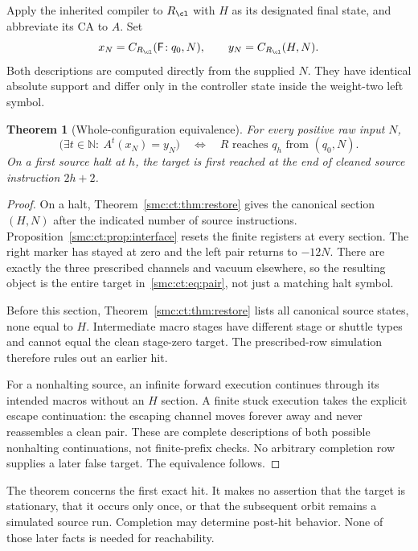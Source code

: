 \documentclass[11pt,letterpaper]{article}
\numberwithin{equation}{section}
\newtheorem{theorem}{Theorem}[section]
\theoremstyle{definition}
\theoremstyle{remark}
\newcommand{\NN}{\mathbb N}
\newcommand{\Fq}[1]{\mathsf F\!:#1}\newcommand{\Bq}[1]{\mathsf B\!:#1}
\begin{document}
Apply the inherited compiler to $R_{\cl}$ with $H$ as its designated final state, and abbreviate its CA to $A$. Set
\begin{equation}\label{smc:ct:eq:pair}
x_N=C_{R_{\cl}}(\Fq {q_0},N),\qquad y_N=C_{R_{\cl}}(H,N).
\end{equation}
Both descriptions are computed directly from the supplied $N$. They have identical absolute support and differ only in the controller state inside the weight-two left symbol.

\begin{theorem}[Whole-configuration equivalence]\label{smc:ct:thm:equiv}
For every positive raw input $N$,
\[
\bigl(\exists t\in\NN:\ A^t(x_N)=y_N\bigr)
\quad\Longleftrightarrow\quad
R\text{ reaches }q_h\text{ from }(q_0,N).
\]
On a first source halt at $h$, the target is first reached at the end of cleaned source instruction $2h+2$.
\end{theorem}
\begin{proof}
On a halt, Theorem~\ref{smc:ct:thm:restore} gives the canonical section $(H,N)$ after the indicated number of source instructions. Proposition~\ref{smc:ct:prop:interface} resets the finite registers at every section. The right marker has stayed at zero and the left pair returns to $-12N$. There are exactly the three prescribed channels and vacuum elsewhere, so the resulting object is the entire target in~\eqref{smc:ct:eq:pair}, not just a matching halt symbol.

Before this section, Theorem~\ref{smc:ct:thm:restore} lists all canonical source states, none equal to $H$. Intermediate macro stages have different stage or shuttle types and cannot equal the clean stage-zero target. The prescribed-row simulation therefore rules out an earlier hit.

For a nonhalting source, an infinite forward execution continues through its intended macros without an $H$ section. A finite stuck execution takes the explicit escape continuation: the escaping channel moves forever away and never reassembles a clean pair. These are complete descriptions of both possible nonhalting continuations, not finite-prefix checks. No arbitrary completion row supplies a later false target. The equivalence follows.
\end{proof}

The theorem concerns the first exact hit. It makes no assertion that the target is stationary, that it occurs only once, or that the subsequent orbit remains a simulated source run. Completion may determine post-hit behavior. None of those later facts is needed for reachability.
\end{document}
